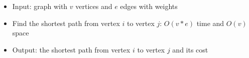 \begin{itemize}
	\item Input: graph with $v$ vertices and $e$ edges with weights
	\item Find the shortest path from vertex $i$ to vertex $j$: $O(v*e)$ time and $O(v)$ space
	\item Output: the shortest path from vertex $i$ to vertex $j$ and its cost
\end{itemize}